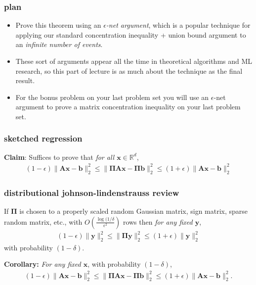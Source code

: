 \documentclass[compress]{beamer}
\newcommand{\bs}[1]{\boldsymbol{#1}}
\newcommand{\bv}[1]{\mathbf{#1}}
\newcommand{\R}{\mathbb{R}}
\begin{document}
\begin{frame}
	\frametitle{plan}
	\begin{itemize}
	\item Prove this theorem using an \emph{$\epsilon$-net argument}, which is a popular technique for applying our standard concentration inequality + union bound argument to an \emph{infinite number of events}.
	
	\item These sort of arguments appear all the time in theoretical algorithms and ML research, so this part of lecture is as much about the technique as the final result. 
	
	\item For the bonus problem on your last problem set you will use an $\epsilon$-net argument to prove a matrix concentration inequality on your last problem set. 
	\end{itemize}
\end{frame}

\begin{frame}[t]
	\frametitle{sketched regression}
	\textbf{Claim}: Suffices to prove that \emph{for all $\bv{x} \in \R^d$},
	\begin{align*}
		(1-\epsilon)\|\bv{A}\bv{x} - \bv{b}\|_2^2 \leq  \|\bs{\Pi}\bv{A}\bv{x} - \bs{\Pi}\bv{b}\|_2^2 \leq (1+\epsilon) \|\bv{A}\bv{x} - \bv{b}\|_2^2
	\end{align*}
\end{frame}

\begin{frame}[t]
	\frametitle{distributional johnson-lindenstrauss review}
	\begin{lemma}[Distributional JL]
		If $\bs{\Pi}$ is chosen to a properly scaled random Gaussian matrix, sign matrix, sparse random matrix, etc., with $O\left(\frac{\log(1/\delta}{\epsilon^2}\right)$ rows then \emph{for any fixed $\bv{y}$}, 
		\begin{align*}
			(1-\epsilon)\|\bv{y}\|_2^2 \leq  \|\bs{\Pi}\bv{y}\|_2^2 \leq (1+\epsilon) \|\bv{y}\|_2^2
		\end{align*}
		with probability $(1-\delta)$. 
	\end{lemma}

\vspace{2em}
\textbf{Corollary:} \emph{For any fixed $\bv{x}$}, with probability $(1-\delta)$,
		\begin{align*}
(1-\epsilon)\|\bv{A}\bv{x} - \bv{b}\|_2^2 \leq  \|\bs{\Pi}\bv{A}\bv{x} - \bs{\Pi}\bv{b}\|_2^2 \leq (1+\epsilon) \|\bv{A}\bv{x} - \bv{b}\|_2^2.
\end{align*}
	
\end{frame}
\end{document}

